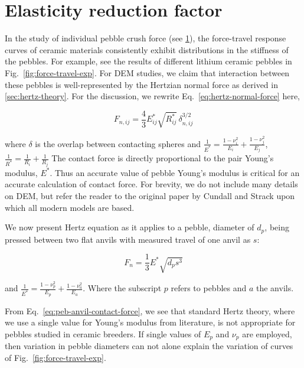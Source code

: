 \section{Elasticity reduction factor}\label{sec:exp-reduction-factor}

In the study of individual pebble crush force (see \cref{sec:exp-reduction-factor}), the force-travel response curves of ceramic materials consistently exhibit distributions in the stiffness of the pebbles. For example, see the results of different lithium ceramic pebbles in Fig.~\ref{fig:force-travel-exp}. For DEM studies, we claim that interaction between these pebbles is well-represented by the Hertzian normal force as derived in \cref{sec:hertz-theory}. For the discussion, we rewrite Eq.~\ref{eq:hertz-normal-force} here,


\begin{equation}
  F_{n,ij} = \frac{4}{3}E_{ij}^* \sqrt{R_{ij}^*} \, \delta_{n,ij}^{3/2}
\end{equation}

where $\delta$ is the overlap between contacting spheres and $\frac{1}{E^*} = \frac{1-\nu_i^2}{E_i} + \frac{1-\nu_j^2}{E_j}$, $\frac{1}{R^*} = \frac{1}{R_i} + \frac{1}{R_j}$
The contact force is directly proportional to the pair Young's modulus, $E^*$. Thus an accurate value of pebble Young's modulus is critical for an accurate calculation of contact force. For brevity, we do not include many details on DEM, but refer the reader to the original paper by Cundall and Strack\cite{Cundall1979} upon which all modern models are based.

We now present Hertz equation as it applies to a pebble, diameter of $d_p$, being pressed between two flat anvils with measured travel of one anvil as $s$:

\begin{equation}\label{eq:peb-anvil-contact-force}
  F_n = \frac{1}{3}E^*\sqrt{d_ps^3}
\end{equation} 

and $\frac{1}{E^*} = \frac{1-\nu_p^2}{E_p} + \frac{1-\nu_a^2}{E_a}$. Where the subscript $p$ refers to pebbles and $a$ the anvils.

From Eq.~\ref{eq:peb-anvil-contact-force}, we see that standard Hertz theory, where we use a single value for Young's modulus from literature, is not appropriate for pebbles studied in ceramic breeders. If single values of $E_p$ and $\nu_p$ are employed, then variation in pebble diameters can not alone explain the variation of curves of Fig.~\ref{fig:force-travel-exp}.
